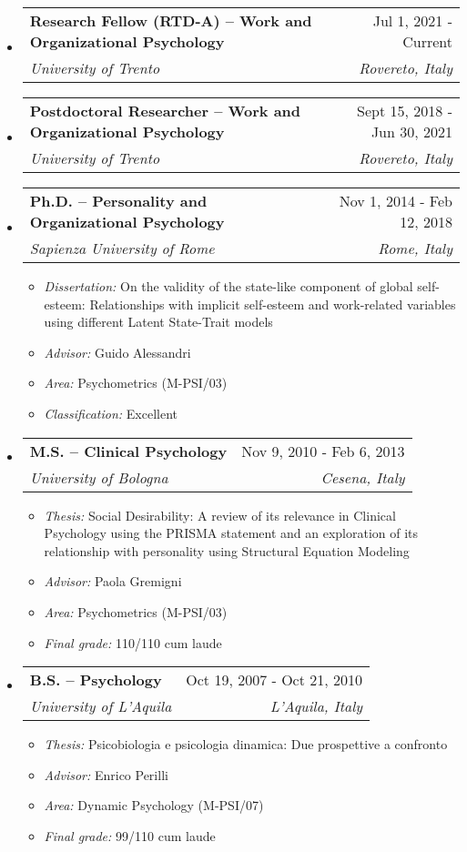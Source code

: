 \documentclass[hidelinks, letterpaper,10pt]{article} %
\makeatletter
\newcommand{\resitem}[1]{\item #1 \vspace{-2pt}}
\newcommand{\ressubheading}[4]{
\begin{tabular*}{6.5in}{l@{\cftdotfill{\cftsecdotsep}\extracolsep{\fill}}r}
		\textbf{#1} & #2 \\
		\textit{#3} & \textit{#4} \\
\end{tabular*}\vspace{-6pt}}
\makeatother
\begin{document}
\begin{itemize}
\item
	\ressubheading{Research Fellow (RTD-A) -- Work and Organizational Psychology}{Jul 1, 2021 - Current} {University of Trento}  {Rovereto, Italy}
	\vspace{.15cm}
	
\item
	\ressubheading {Postdoctoral Researcher -- Work and Organizational Psychology} {Sept 15, 2018 - Jun 30, 2021} {University of Trento} {Rovereto, Italy}
	\vspace{.15cm}

\item
	\ressubheading{Ph.D. -- Personality and Organizational Psychology} {Nov 1, 2014 - Feb 12, 2018}{Sapienza University of Rome}  {Rome, Italy}
	\begin{itemize}
		\resitem{\textit{Dissertation:} On the validity of the state-like component of global self-esteem: Relationships with implicit self-esteem and work-related variables using different Latent State-Trait models}
		\resitem{\textit{Advisor:} Guido Alessandri}
		\resitem{\textit{Area:} Psychometrics (M-PSI/03)}
		\resitem{\textit{Classification:} Excellent}
		\vspace{.15cm}
	\end{itemize}
	
\item
     \ressubheading{M.S. -- Clinical Psychology} {Nov 9, 2010 - Feb 6, 2013}{University of Bologna}  {Cesena, Italy}
    \begin{itemize}
	    \resitem{\textit{Thesis:} Social Desirability: A review of its relevance in Clinical Psychology using the PRISMA statement and an exploration of its relationship with personality using Structural Equation Modeling}
	    \resitem{\textit{Advisor:} Paola Gremigni}
	    \resitem{\textit{Area:} Psychometrics (M-PSI/03)}
	    \resitem{\textit{Final grade:} 110/110 cum laude}
	    \vspace{.15cm}
\end{itemize}

\item
	\ressubheading{B.S. -- Psychology}{Oct 19, 2007 - Oct 21, 2010}{University of L'Aquila}{L'Aquila, Italy}
	\begin{itemize}
	\resitem{\textit{Thesis:} Psicobiologia e psicologia dinamica: Due prospettive a confronto}
	\resitem{\textit{Advisor:} Enrico Perilli}
	\resitem{\textit{Area:} Dynamic Psychology (M-PSI/07)}
	\resitem{\textit{Final grade:} 99/110 cum laude}
\end{itemize}
\end{itemize}
\end{document}
